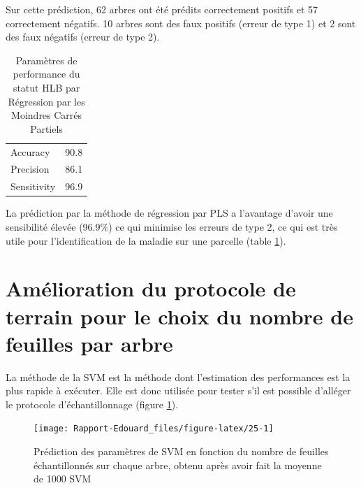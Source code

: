 \documentclass[
  11pt,
  french,
  a4paper,
  extrafontsizes,onecolumn,openright
  ]{memoir}
\begin{document}
\normalsize

Sur cette prédiction, 62 arbres ont été prédits correctement positifs et 57 correctement négatifs. 10 arbres sont des faux positifs (erreur de type 1) et 2 sont des faux négatifs (erreur de type 2).

\scriptsize

\begin{longtable}[t]{lr}
\caption{\label{tab:T4}Paramètres de performance du statut HLB par Régression par les Moindres Carrés Partiels}\\
\toprule
Accuracy & 90.8\\
Precision & 86.1\\
Sensitivity & 96.9\\
\bottomrule
\end{longtable}

\normalsize

La prédiction par la méthode de régression par PLS a l'avantage d'avoir une sensibilité élevée (96.9\%) ce qui minimise les erreurs de type 2, ce qui est très utile pour l'identification de la maladie sur une parcelle (table \ref{tab:T4}).

\vfill
\newpage

\hypertarget{amuxe9lioration-du-protocole-de-terrain-pour-le-choix-du-nombre-de-feuilles-par-arbre}{%
\section{Amélioration du protocole de terrain pour le choix du nombre de feuilles par arbre}\label{amuxe9lioration-du-protocole-de-terrain-pour-le-choix-du-nombre-de-feuilles-par-arbre}}

La méthode de la SVM est la méthode dont l'estimation des performances est la plus rapide à exécuter. Elle est donc utilisée pour tester s'il est possible d'alléger le protocole d'échantillonnage (figure \ref{fig:25}).

\scriptsize

\begin{figure}

{\centering \texttt{[image: Rapport-Edouard\_files/figure-latex/25-1]} 

}

\caption{Prédiction des paramètres de SVM en fonction du nombre de feuilles échantillonnés sur chaque arbre, obtenu après avoir fait la moyenne de 1000 SVM}\label{fig:25}
\end{figure}

\normalsize
\end{document}

